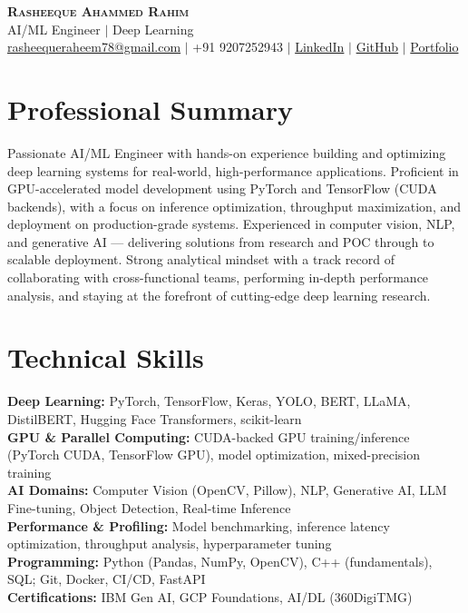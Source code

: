 \documentclass[letterpaper,11pt]{article}
\begin{document}
\begin{center}
    \textbf{\Huge \scshape Rasheeque Ahammed Rahim} \\ \vspace{1pt}
    \small AI/ML Engineer $|$ Deep Learning \\ \vspace{3pt}
    \small \href{mailto:rasheequeraheem78@gmail.com}{rasheequeraheem78@gmail.com} $|$ 
    +91 9207252943 $|$ 
    \href{https://www.linkedin.com/in/rasheeque-ahammed-raheem-aa777325a}{LinkedIn} $|$
    \href{https://github.com/Rasheequeahammed}{GitHub} $|$
    \href{https://rasheequeahammed.github.io/Rasheeque-PortFolio/}{Portfolio}
\end{center}
\vspace{-3pt}

\section{Professional Summary}
  \small{Passionate AI/ML Engineer with hands-on experience building and optimizing deep learning systems for real-world, high-performance applications. Proficient in GPU-accelerated model development using PyTorch and TensorFlow (CUDA backends), with a focus on inference optimization, throughput maximization, and deployment on production-grade systems. Experienced in computer vision, NLP, and generative AI — delivering solutions from research and POC through to scalable deployment. Strong analytical mindset with a track record of collaborating with cross-functional teams, performing in-depth performance analysis, and staying at the forefront of cutting-edge deep learning research.}

\section{Technical Skills}
 \begin{itemize}[leftmargin=0.15in, label={}]
    \small{\item{
     \textbf{Deep Learning:} PyTorch, TensorFlow, Keras, YOLO, BERT, LLaMA, DistilBERT, Hugging Face Transformers, scikit-learn \\
     \textbf{GPU \& Parallel Computing:} CUDA-backed GPU training/inference (PyTorch CUDA, TensorFlow GPU), model optimization, mixed-precision training \\
     \textbf{AI Domains:} Computer Vision (OpenCV, Pillow), NLP, Generative AI, LLM Fine-tuning, Object Detection, Real-time Inference \\
     \textbf{Performance \& Profiling:} Model benchmarking, inference latency optimization, throughput analysis, hyperparameter tuning \\
     \textbf{Programming:} Python (Pandas, NumPy, OpenCV), C++ (fundamentals), SQL; Git, Docker, CI/CD, FastAPI \\
     \textbf{Certifications:} IBM Gen AI, GCP Foundations, AI/DL (360DigiTMG)
    }}
 \end{itemize}
 \vspace{-6pt}
\end{document}
